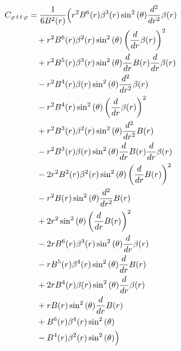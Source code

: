 \documentclass[11pt,a4paper]{article}
\begin{document}
\begin{align*}
  C_{\varphi\,t\,t\,\varphi} &= \frac{1}{6 B^{2}{\left(r \right)}}\Bigl(r^{2} B^{6}{\left(r \right)} \beta^{3}{\left(r \right)} \sin^{2}{\left(\theta \right)} \frac{d^{2}}{d r^{2}} \beta{\left(r \right)} \\
  &\quad + r^{2} B^{6}{\left(r \right)} \beta^{2}{\left(r \right)} \sin^{2}{\left(\theta \right)} \left(\frac{d}{d r} \beta{\left(r \right)}\right)^{2} \\
  &\quad + r^{2} B^{5}{\left(r \right)} \beta^{3}{\left(r \right)} \sin^{2}{\left(\theta \right)} \frac{d}{d r} B{\left(r \right)} \frac{d}{d r} \beta{\left(r \right)} \\
  &\quad - r^{2} B^{4}{\left(r \right)} \beta{\left(r \right)} \sin^{2}{\left(\theta \right)} \frac{d^{2}}{d r^{2}} \beta{\left(r \right)} \\
  &\quad - r^{2} B^{4}{\left(r \right)} \sin^{2}{\left(\theta \right)} \left(\frac{d}{d r} \beta{\left(r \right)}\right)^{2} \\
  &\quad + r^{2} B^{3}{\left(r \right)} \beta^{2}{\left(r \right)} \sin^{2}{\left(\theta \right)} \frac{d^{2}}{d r^{2}} B{\left(r \right)} \\
  &\quad - r^{2} B^{3}{\left(r \right)} \beta{\left(r \right)} \sin^{2}{\left(\theta \right)} \frac{d}{d r} B{\left(r \right)} \frac{d}{d r} \beta{\left(r \right)} \\
  &\quad - 2 r^{2} B^{2}{\left(r \right)} \beta^{2}{\left(r \right)} \sin^{2}{\left(\theta \right)} \left(\frac{d}{d r} B{\left(r \right)}\right)^{2} \\
  &\quad - r^{2} B{\left(r \right)} \sin^{2}{\left(\theta \right)} \frac{d^{2}}{d r^{2}} B{\left(r \right)} \\
  &\quad + 2 r^{2} \sin^{2}{\left(\theta \right)} \left(\frac{d}{d r} B{\left(r \right)}\right)^{2} \\
  &\quad - 2 r B^{6}{\left(r \right)} \beta^{3}{\left(r \right)} \sin^{2}{\left(\theta \right)} \frac{d}{d r} \beta{\left(r \right)} \\
  &\quad - r B^{5}{\left(r \right)} \beta^{4}{\left(r \right)} \sin^{2}{\left(\theta \right)} \frac{d}{d r} B{\left(r \right)} \\
  &\quad + 2 r B^{4}{\left(r \right)} \beta{\left(r \right)} \sin^{2}{\left(\theta \right)} \frac{d}{d r} \beta{\left(r \right)} \\
  &\quad + r B{\left(r \right)} \sin^{2}{\left(\theta \right)} \frac{d}{d r} B{\left(r \right)} \\
  &\quad + B^{6}{\left(r \right)} \beta^{4}{\left(r \right)} \sin^{2}{\left(\theta \right)} \\
  &\quad - B^{4}{\left(r \right)} \beta^{2}{\left(r \right)} \sin^{2}{\left(\theta \right)}\Bigr)
\end{align*}
\end{document}
